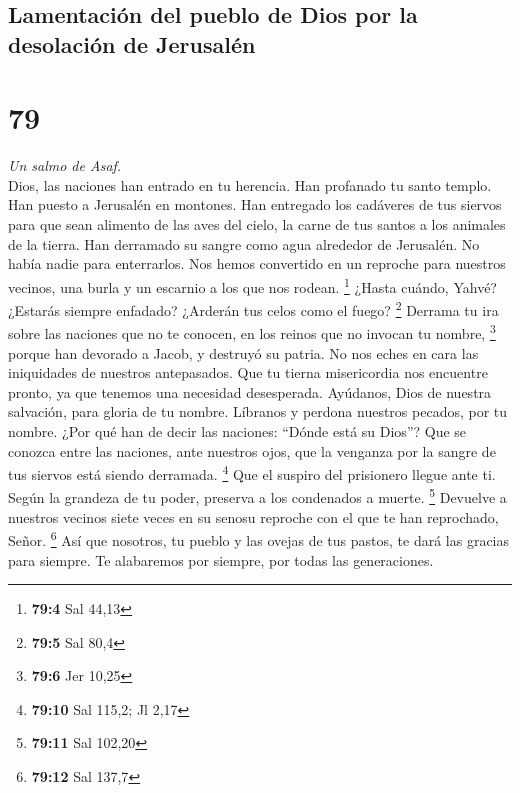 \begin{paracol}{2}
{\subsection{Lamentación del pueblo de Dios por la desolación de
Jerusalén}\label{lamentaciuxf3n-del-pueblo-de-dios-por-la-desolaciuxf3n-de-jerusaluxe9n}}

\hypertarget{section-156}{%
\section{79}\label{section-156}}

\emph{Un salmo de Asaf.}\\
 Dios, las naciones han entrado en tu herencia. Han
profanado tu santo templo. Han puesto a Jerusalén en montones.
 Han entregado los cadáveres de tus siervos para que sean
alimento de las aves del cielo, la carne de tus santos a los animales de
la tierra.  Han derramado su sangre como agua alrededor de
Jerusalén. No había nadie para enterrarlos.  Nos hemos
convertido en un reproche para nuestros vecinos, una burla y un escarnio
a los que nos rodean. \footnote{\textbf{79:4} Sal 44,13} 
¿Hasta cuándo, Yahvé? ¿Estarás siempre enfadado? ¿Arderán tus celos como
el fuego? \footnote{\textbf{79:5} Sal 80,4}  Derrama tu
ira sobre las naciones que no te conocen, en los reinos que no invocan
tu nombre, \footnote{\textbf{79:6} Jer 10,25}  porque han
devorado a Jacob, y destruyó su patria.  No nos eches en
cara las iniquidades de nuestros antepasados. Que tu tierna misericordia
nos encuentre pronto, ya que tenemos una necesidad desesperada.
 Ayúdanos, Dios de nuestra salvación, para gloria de tu
nombre. Líbranos y perdona nuestros pecados, por tu nombre.
 ¿Por qué han de decir las naciones: ``Dónde está su
Dios''? Que se conozca entre las naciones, ante nuestros ojos, que la
venganza por la sangre de tus siervos está siendo derramada. \footnote{\textbf{79:10}
  Sal 115,2; Jl 2,17}  Que el suspiro del prisionero
llegue ante ti. Según la grandeza de tu poder, preserva a los condenados
a muerte. \footnote{\textbf{79:11} Sal 102,20}  Devuelve
a nuestros vecinos siete veces en su senosu reproche con el que te han
reprochado, Señor. \footnote{\textbf{79:12} Sal 137,7} 
Así que nosotros, tu pueblo y las ovejas de tus pastos, te dará las
gracias para siempre. Te alabaremos por siempre, por todas las
generaciones.


\end{paracol}
